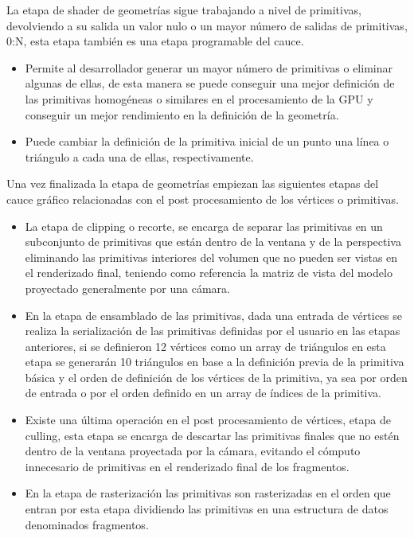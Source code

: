 \documentclass[a4paper, 17pt]{book}
\begin{document}
La etapa de shader de geometrías sigue trabajando a nivel de primitivas, devolviendo a su salida un valor nulo o un mayor número de
salidas de primitivas, 0:N, esta etapa también es una etapa programable del cauce.

\begin{itemize}
  \item Permite al desarrollador generar un mayor número de primitivas o eliminar algunas de ellas, de esta manera se puede conseguir
  una mejor definición de las primitivas homogéneas o similares en el procesamiento de la GPU y conseguir un mejor rendimiento en la
  definición de la geometría.
  
  \item Puede cambiar la definición de la primitiva inicial de un punto una línea o triángulo a cada una de ellas, respectivamente.
\end{itemize}

Una vez finalizada la etapa de geometrías empiezan las siguientes etapas del cauce gráfico relacionadas con el post procesamiento
de los vértices o primitivas.

\begin{itemize}
  \item La etapa de clipping o recorte, se encarga de separar las primitivas en un subconjunto de primitivas que están dentro de la
  ventana y de la perspectiva eliminando las primitivas interiores del volumen que no pueden ser vistas en el renderizado final,
  teniendo como referencia la matriz de vista del modelo proyectado generalmente por una cámara.
  
  \item En la etapa de ensamblado de las primitivas, dada una entrada de vértices se realiza la serialización de las primitivas
  definidas por el usuario en las etapas anteriores, si se definieron 12 vértices como un array de triángulos en esta etapa se
  generarán 10 triángulos en base a la definición previa de la primitiva básica y el orden de definición de los vértices de la
  primitiva, ya sea por orden de entrada o por el orden definido en un array de índices de la primitiva.

  \item Existe una última operación en el post procesamiento de vértices, etapa de culling, esta etapa se encarga de descartar las
  primitivas finales que no estén dentro de la ventana proyectada por la cámara, evitando el cómputo innecesario de primitivas en
  el renderizado final de los fragmentos.

  \item En la etapa de rasterización las primitivas son rasterizadas en el orden que entran por esta etapa dividiendo las primitivas
  en una estructura de datos denominados fragmentos.
\end{itemize}
\end{document}
